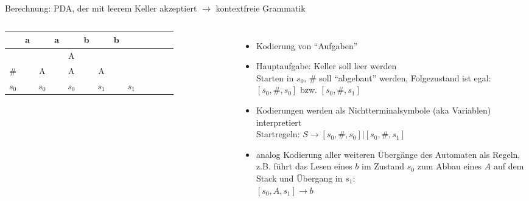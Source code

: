 \begin{frame}{Berechnung: PDA, der mit leerem Keller akzeptiert $\rightarrow$ kontextfreie Grammatik}
	\begin{columns}
		\begin{tabular}{ccccccccccccc}
			& a &  & a &  & b &  & b &  \\
			\hline
			&  &  &  & A &  &  &  &  \\
			\# &  & A &  & A &  & A &  &  \\
			\hline
			$s_0$ &  & $s_0$ &  & $s_0$ &  & $s_1$ &  & $s_1$ \\
		\end{tabular}
		\begin{itemize}
			\item Kodierung von "`Aufgaben"'
			\item Hauptaufgabe: Keller soll leer werden\\
			Starten in $s_0$, \# soll "`abgebaut"' werden, Folgezustand ist egal: $[s_0, \#, s_0]$ bzw. $[s_0, \#, s_1]$
			\item Kodierungen werden als Nichtterminalsymbole (aka Variablen) interpretiert\\
			Startregeln: $S \rightarrow [s_0, \#, s_0]|[s_0, \#, s_1]$
			\item analog Kodierung aller weiteren Übergänge des Automaten als Regeln, z.B. führt das Lesen eines $b$ im Zustand $s_0$ zum Abbau eines $A$ auf dem Stack und Übergang in $s_1$:\\
			$[s_0, A, s_1] \rightarrow b$
		\end{itemize}
	\end{columns}
\end{frame}

